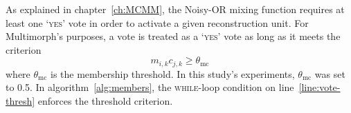 As explained in chapter~\ref{ch:MCMM}, the 
 Noisy-OR mixing function requires at least one `\textsc{yes}' vote 
 in order to activate a given reconstruction unit.
 For Multimorph's 
 purposes, a vote is treated as a `\textsc{yes}' vote as long as it meets 
 the criterion 
 \begin{equation}\label{eq:vote-criterion}
 m_{i,k}c_{j,k} \geq \theta_{\text{mc}}
 \end{equation}
 where $\theta_{\text{mc}}$ is the membership threshold. %
 In this study's experiments, $\theta_{\text{mc}}$ 
 was 
 set to 0.5.
 In algorithm~\ref{alg:members}, the \textsc{while}-loop condition on line~\ref{line:vote-thresh} enforces the threshold criterion. 
 
